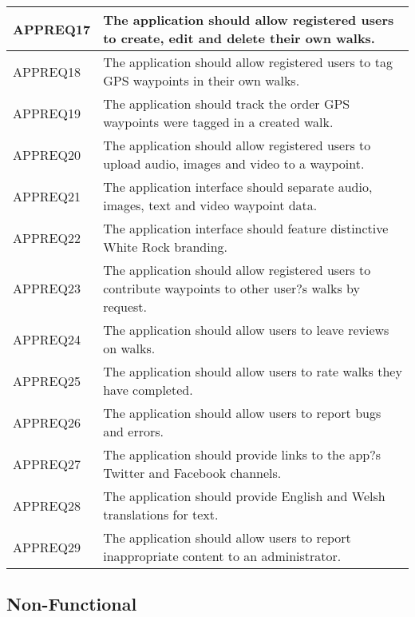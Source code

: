 \documentclass[11pt,a4paper]{article}
\begin{document}
\begin{longtable}{|p{2.5cm}p{13cm}|}
APPREQ17 & The application should allow registered users to create, edit and delete their own walks. \\ \hline
APPREQ18 & The application should allow registered users to tag GPS waypoints in their own walks. \\ \hline
APPREQ19 & The application should track the order GPS waypoints were tagged in a created walk. \\ \hline
APPREQ20 & The application should allow registered users to upload audio, images and video to a waypoint. \\ \hline
APPREQ21 & The application interface should separate audio, images, text and video waypoint data. \\ \hline
APPREQ22 & The application interface should feature distinctive White Rock branding. \\ \hline
APPREQ23 & The application should allow registered users to contribute waypoints to other user?s walks by request. \\ \hline
APPREQ24 & The application should allow users to leave reviews on walks. \\ \hline
APPREQ25 & The application should allow users to rate walks they have completed. \\ \hline
APPREQ26 & The application should allow users to report bugs and errors. \\ \hline
APPREQ27 & The application should provide links to the app?s Twitter and Facebook channels. \\ \hline
APPREQ28 & The application should provide English and Welsh translations for text. \\ \hline
APPREQ29 & The application should allow users to report inappropriate content to an administrator. \\ \hline

\end{longtable}

\subsection{Non-Functional}
\label{sec:non-func-reqs}
\end{document}

